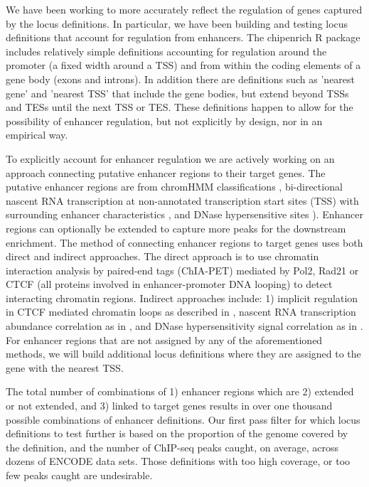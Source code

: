 We have been working to more accurately reflect the regulation of genes captured by the locus definitions. In particular, we have been building and testing locus definitions that account for regulation from enhancers. The chipenrich R package includes relatively simple definitions accounting for regulation around the promoter (a fixed width around a TSS) and from within the coding elements of a gene body (exons and introns). In addition there are definitions such as 'nearest gene' and 'nearest TSS' that include the gene bodies, but extend beyond TSSs and TESs until the next TSS or TES. These definitions happen to allow for the possibility of enhancer regulation, but not explicitly by design, nor in an empirical way.

To explicitly account for enhancer regulation we are actively working on an approach connecting putative enhancer regions to their target genes. The putative enhancer regions are from chromHMM classifications \cite{Ernst:2012ii}, bi-directional nascent RNA transcription at non-annotated transcription start sites (TSS) with surrounding enhancer characteristics \cite{Andersson:2014bn}, and DNase hypersensitive sites \cite{Thurman:2012fe}). Enhancer regions can optionally be extended to capture more peaks for the downstream enrichment. The method of connecting enhancer regions to target genes uses both direct and indirect approaches. The direct approach is to use chromatin interaction analysis by paired-end tags (ChIA-PET) mediated by Pol2, Rad21 or CTCF (all proteins involved in enhancer-promoter DNA looping) to detect interacting chromatin regions. Indirect approaches include: 1) implicit regulation in CTCF mediated chromatin loops as described in \cite{Rao:2014eo}, nascent RNA transcription abundance correlation as in \cite{Thurman:2012fe}, and DNase hypersensitivity signal correlation as in \cite{Thurman:2012fe}. For enhancer regions that are not assigned by any of the aforementioned methods, we will build additional locus definitions where they are assigned to the gene with the nearest TSS.

The total number of combinations of 1) enhancer regions which are 2) extended or not extended, and 3) linked to target genes results in over one thousand possible combinations of enhancer definitions. Our first pass filter for which locus definitions to test further is based on the proportion of the genome covered by the definition, and the number of ChIP-seq peaks caught, on average, across dozens of ENCODE data sets. Those definitions with too high coverage, or too few peaks caught are undesirable.

